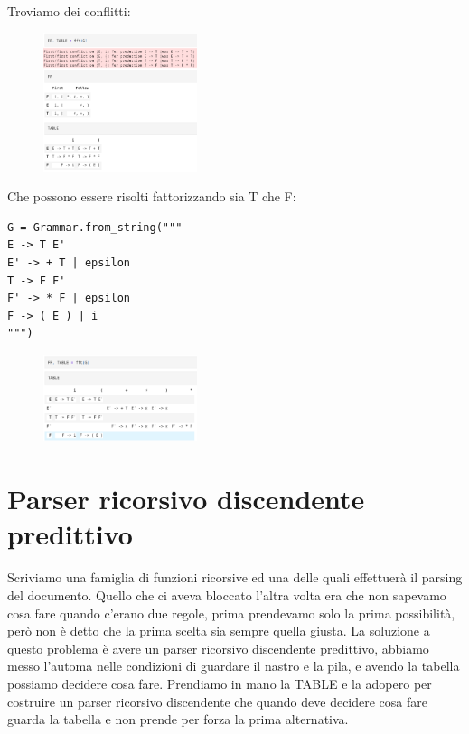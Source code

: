 \newpage

Troviamo dei conflitti:
\begin{figure}[ht!]
  \centering
  \includegraphics[width=0.4\textwidth]{images/Parsing/conflitti.png}
\end{figure}

Che possono essere risolti fattorizzando sia T che F:
\begin{lstlisting}
G = Grammar.from_string("""
E -> T E'
E' -> + T | epsilon
T -> F F'
F' -> * F | epsilon
F -> ( E ) | i
""")
\end{lstlisting}

\begin{figure}[ht!]
  \centering
  \includegraphics[width=0.4\textwidth]{images/Parsing/conflittiRisolti.png}
\end{figure}

\section{Parser ricorsivo discendente predittivo}

Scriviamo una famiglia di funzioni ricorsive ed una delle quali effettuerà il parsing del documento. Quello che ci aveva bloccato l'altra volta era che non sapevamo cosa fare quando c'erano due regole, prima prendevamo solo la prima possibilità, però non è detto che la prima scelta sia sempre quella giusta.
La soluzione a questo problema è avere un parser ricorsivo discendente predittivo, abbiamo messo l'automa nelle condizioni di guardare il nastro e la pila, e avendo la tabella possiamo decidere cosa fare. Prendiamo in mano la TABLE e la adopero per costruire un parser ricorsivo discendente che quando deve decidere cosa fare guarda la tabella e non prende per forza la prima alternativa.

